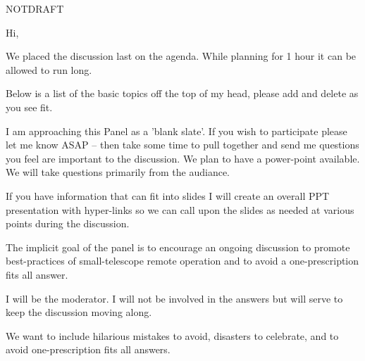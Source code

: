 \documentclass[letter,11pt,oneside]{article}
\def\documentisdraft{NOTDRAFT}
\begin{document}

\setcounter{section}{1}

\ifx\documentisdraft\drafttest
\linenumbers    %
\fi


Hi,

\vskip 1cm

\begin{quote}{}
\end{quote}
\vskip 1cm

We placed the discussion last on the agenda. While planning for 1 hour
it can be allowed to run long.

Below is a list of the basic topics off the top of my head, please
add and delete as you see fit.

I am approaching this Panel as a 'blank slate'. If you wish to
participate please let me know ASAP -- then take some time to pull
together and send me questions you feel are important to the
discussion.  We plan to have a power-point available. We will
take questions primarily from the audiance.

If you have information that can fit into slides I will create an
overall PPT presentation with hyper-links so we can call upon the
slides as needed at various points during the discussion.

The implicit goal of the panel is to encourage an ongoing discussion
to promote best-practices of small-telescope remote operation and to
avoid a one-prescription fits all answer.

I will be the moderator. I will not be involved in the answers but
will serve to keep the discussion moving along. 

We want to include hilarious mistakes to avoid, disasters to celebrate,
and to avoid one-prescription fits all answers.
\end{document}
